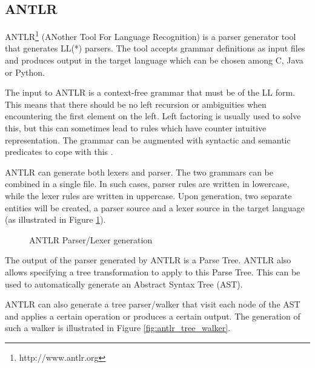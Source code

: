 \subsection{ANTLR}

ANTLR\footnote{http://www.antlr.org} (ANother Tool For Language
Recognition) is a parser generator tool that generates LL(*)
parsers. The tool accepts grammar definitions as input files and
produces output in the target language which can be chosen among C,
Java or Python.

The input to ANTLR is a context-free grammar that must be of the LL
form. This means that there should be no left recursion or ambiguities
when encountering the first element on the left. Left factoring is
usually used to solve this, but this can sometimes lead to rules which
have counter intuitive representation. The grammar can be augmented with
syntactic and semantic predicates to cope with this \cite{ANTLR,ANTLR2}.

ANTLR can generate both lexers and parser. The two grammars can be
combined in a single file.  In such cases, parser rules are written in
lowercase, while the lexer rules are written in uppercase. Upon
generation, two separate entities will be created, a parser source and
a lexer source in the target language (as illustrated in Figure
\ref{fig:antlr_parser_lexer}).

\begin{figure}[hb!]
  \centering
  \caption{ANTLR Parser/Lexer generation}
  \label{fig:antlr_parser_lexer}
\end{figure}

The output of the parser generated by ANTLR is a Parse Tree. ANTLR
also allows specifying a tree transformation to apply to this Parse
Tree. This can be used to automatically generate an Abstract Syntax
Tree (AST).

ANTLR can also generate a tree parser/walker that visit each node of
the AST and applies a certain operation or produces a certain
output. The generation of such a walker is illustrated in Figure
\ref{fig:antlr_tree_walker}.

